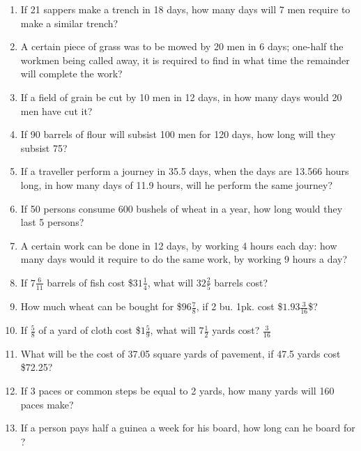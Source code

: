 \documentclass[12pt]{article}
\begin{document}
\begin{enumerate}
\item If 21 sappers make a trench in 18 days, how many days will 7 men require to make a similar trench? 
\spacing

\item A certain piece of grass was to be mowed by 20 men in 6 days; one-half the workmen being called away, it is required to find in what time the remainder will complete the work? 
\spacing

\item If a field of grain be cut by 10 men in 12 days, in how many days would 20 men have cut it? 
\spacing

\item If 90 barrels of flour will subsist 100 men for 120 days, how long will they subsist 75? 
\spacing

\item If a traveller perform a journey in 35.5 days, when the days are 13.566 hours long, in how many days of 11.9 hours, will he perform the same journey? 
\spacing

\item If 50 persons consume 600 bushels of wheat in a year, how long would they last 5 persons?  
\spacing

\item A certain work can be done in 12 days, by working 4 hours each day: how many days would it require to do the same work, by working 9 hours a day? 
\spacing

\item If $7\frac{6}{11}$ barrels of fish cost \$$31\frac{1}{4}$, what will $32\frac{2}{5}$ barrels cost? 
\spacing

\item How much wheat can be bought for \$$96\frac{7}{8}$, if 2 bu. 1pk. cost \$$1.93\frac{3}{16}$\$?
\spacing

\item If $\frac{5}{8}$ of a yard of cloth cost \$$1\frac{5}{9}$, what will $7\frac{1}{2}$ yards cost? $\frac{3}{16}$
\spacing

\item What will be the cost of 37.05 square yards of pavement, if 47.5 yards cost \$72.25? 
\spacing

\item If 3 paces or common steps be equal to 2 yards, how many yards will 160 paces make? 
\spacing
\item If a person pays half a guinea a week for his board, how long can he board for ? 
\spacing


\end{enumerate}
\end{document}
